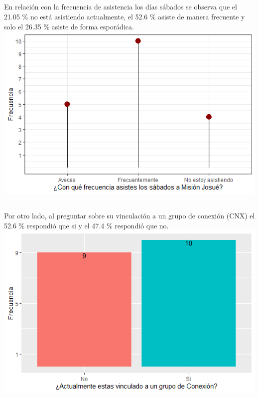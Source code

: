 \documentclass{beamer}
\begin{document}
\subsection{}
\begin{frame}{}
\vspace{-0.9\baselineskip}
\begin{tcolorbox}[colback=backframe_color,colframe=beamer_color,title=] 

En relación con la frecuencia de asistencia los días sábados se observa que el 21.05 \% no está asistiendo actualmente, el 52.6 \% asiste de manera frecuente y solo el 26.35 \% asiste de forma esporádica. 
\includegraphics[width=0.9\linewidth]{special_figures/Rplot01_1.png}
\end{tcolorbox}
\end{frame}



\subsection{}
\begin{frame}{}
\vspace{-0.9\baselineskip}
\begin{tcolorbox}[colback=backframe_color,colframe=beamer_color,title=] 

Por otro lado, al preguntar sobre su vinculación a un grupo de conexión (CNX) el 52.6 \% respondió que si y el 47.4 \% respondió que no. 
\includegraphics[width=0.8\linewidth]{special_figures/Rplot05.png}
\end{tcolorbox}
\end{frame}
\end{document}
